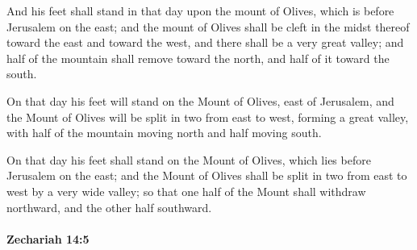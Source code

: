 			\begin{versebox}
					\item[BHS] 
					\item[LXX] 
					\item[ASV] And his feet shall stand in that day upon the mount of Olives, which is before Jerusalem on the east; and the mount of Olives shall be cleft in the midst thereof toward the east and toward the west, and there shall be a very great valley; and half of the mountain shall remove toward the north, and half of it toward the south.
					\item[NIV] On that day his feet will stand on the Mount of Olives, east of Jerusalem, and the Mount of Olives will be split in two from east to west, forming a great valley, with half of the mountain moving north and half moving south.
					\item[NRSV] On that day his feet shall stand on the Mount of Olives, which lies before Jerusalem on the east; and the Mount of Olives shall be split in two from east to west by a very wide valley; so that one half of the Mount shall withdraw northward, and the other half southward.
			\end{versebox}

		\paragraph{Zechariah 14:5} %
			\label{ZECHARIAH-14-5}

